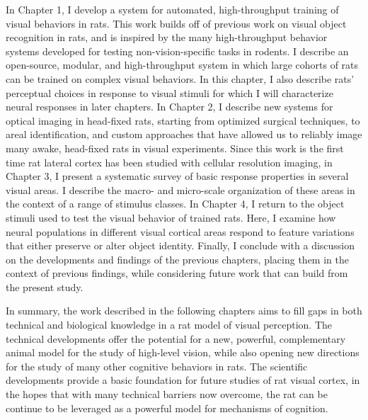 In Chapter 1, I develop a system for automated, high-throughput training of visual behaviors in rats. This work builds off of previous work on visual object recognition in rats, and is inspired by the many high-throughput behavior systems developed for testing non-vision-specific tasks in rodents. I describe an open-source, modular, and high-throughput system in which large cohorts of rats can be trained on complex visual behaviors. In this chapter, I also describe rats' perceptual choices in response to visual stimuli for which I will characterize neural responses in later chapters. In Chapter 2, I describe new systems for optical imaging in head-fixed rats, starting from optimized surgical techniques, to areal identification, and custom approaches that have allowed us to reliably image many awake, head-fixed rats in visual experiments. Since this work is the first time rat lateral cortex has been studied with cellular resolution imaging, in Chapter 3, I present a systematic survey of basic response properties in several visual areas. I describe the macro- and micro-scale organization of these areas in the context of a range of stimulus classes. In Chapter 4, I return to the object stimuli used to test the visual behavior of trained rats. Here, I examine how neural populations in different visual cortical areas respond to feature variations that either preserve or alter object identity. Finally, I conclude with a discussion on the developments and findings of the previous chapters, placing them in the context of previous findings, while considering future work that can build from the present study.

In summary, the work described in the following chapters aims to fill gaps in both technical and biological knowledge in a rat model of visual perception. The technical developments offer the potential for a new, powerful, complementary animal model for the study of high-level vision, while also opening new directions for the study of many other cognitive behaviors in rats. The scientific developments provide a basic foundation for future studies of rat visual cortex, in the hopes that with many technical barriers now overcome, the rat can be continue to be leveraged as a powerful model for mechanisms of cognition. 





